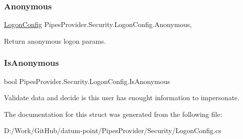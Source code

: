 \subsubsection{\texorpdfstring{Anonymous}{Anonymous}}
{\footnotesize\ttfamily \mbox{\hyperlink{struct_pipes_provider_1_1_security_1_1_logon_config}{Logon\+Config}} Pipes\+Provider.\+Security.\+Logon\+Config.\+Anonymous\hspace{0.3cm}{\ttfamily [static]}, {\ttfamily [get]}}



Return anonymous logon params. 

\mbox{\label{struct_pipes_provider_1_1_security_1_1_logon_config_a75522f37bf91bbd20f01fa4498d28dd1}} 
\subsubsection{\texorpdfstring{Is\+Anonymous}{IsAnonymous}}
{\footnotesize\ttfamily bool Pipes\+Provider.\+Security.\+Logon\+Config.\+Is\+Anonymous\hspace{0.3cm}{\ttfamily [get]}}



Validate data and decide is this user has enought information to impersonate. 



The documentation for this struct was generated from the following file\+:\begin{DoxyCompactItemize}
\item 
D\+:/\+Work/\+Git\+Hub/datum-\/point/\+Pipes\+Provider/\+Security/Logon\+Config.\+cs\end{DoxyCompactItemize}
